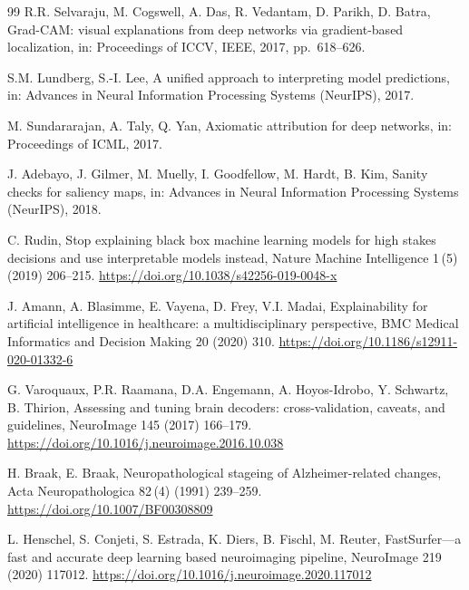 \documentclass[12pt,a4paper]{article}
\begin{document}
\begin{thebibliography}{99}
R.R. Selvaraju, M. Cogswell, A. Das, R. Vedantam, D. Parikh, D. Batra, Grad-CAM: visual explanations from deep networks via gradient-based localization, in: Proceedings of ICCV, IEEE, 2017, pp.\ 618--626.

S.M. Lundberg, S.-I. Lee, A unified approach to interpreting model predictions, in: Advances in Neural Information Processing Systems (NeurIPS), 2017.

M. Sundararajan, A. Taly, Q. Yan, Axiomatic attribution for deep networks, in: Proceedings of ICML, 2017.

J. Adebayo, J. Gilmer, M. Muelly, I. Goodfellow, M. Hardt, B. Kim, Sanity checks for saliency maps, in: Advances in Neural Information Processing Systems (NeurIPS), 2018.

C. Rudin, Stop explaining black box machine learning models for high stakes decisions and use interpretable models instead, Nature Machine Intelligence 1\,(5) (2019) 206--215.
\url{https://doi.org/10.1038/s42256-019-0048-x}

J. Amann, A. Blasimme, E. Vayena, D. Frey, V.I. Madai, Explainability for artificial intelligence in healthcare: a multidisciplinary perspective, BMC Medical Informatics and Decision Making 20 (2020) 310.
\url{https://doi.org/10.1186/s12911-020-01332-6}

G. Varoquaux, P.R. Raamana, D.A. Engemann, A. Hoyos-Idrobo, Y. Schwartz, B. Thirion, Assessing and tuning brain decoders: cross-validation, caveats, and guidelines, NeuroImage 145 (2017) 166--179.
\url{https://doi.org/10.1016/j.neuroimage.2016.10.038}

H. Braak, E. Braak, Neuropathological stageing of Alzheimer-related changes, Acta Neuropathologica 82\,(4) (1991) 239--259.
\url{https://doi.org/10.1007/BF00308809}

L. Henschel, S. Conjeti, S. Estrada, K. Diers, B. Fischl, M. Reuter, FastSurfer---a fast and accurate deep learning based neuroimaging pipeline, NeuroImage 219 (2020) 117012.
\url{https://doi.org/10.1016/j.neuroimage.2020.117012}


\end{thebibliography}
\end{document}
